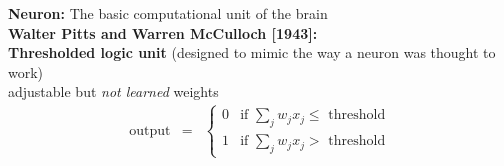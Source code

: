 \documentclass[10pt, compress]{beamer}
\begin{document}
\begin{frame}
  \vspace*{1cm}
  \textbf{Neuron:} The basic computational unit of the brain  \\
  \textbf{Walter Pitts and Warren McCulloch [1943]:}\\
  \textbf{Thresholded logic unit} (designed to mimic the way a neuron was thought to work) \\
  adjustable but \textit{not learned} weights \\
  \vspace*{-.5cm}
  \begin{eqnarray}
  \mbox{output} & = & \left\{ \begin{array}{ll}
  0 & \mbox{if } \sum_j w_j x_j \leq \mbox{ threshold} \\
  1 & \mbox{if } \sum_j w_j x_j > \mbox{ threshold}
  \end{array} \right.
  \nonumber
  \end{eqnarray}
  \hrulefill \\
  \begin{figure}[ht]
  	\centering
  	\qquad
  \end{figure}
\end{frame}
\end{document}

